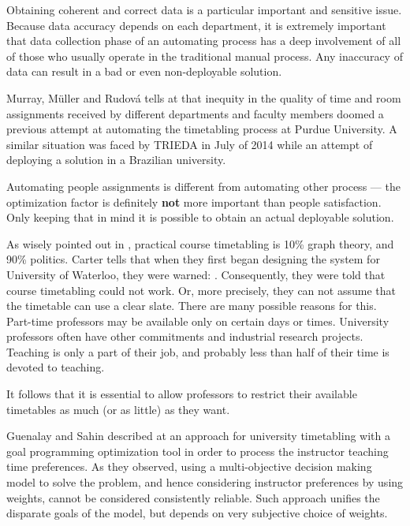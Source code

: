 Obtaining coherent and correct data is a particular important and sensitive issue. Because data accuracy depends on each department, it is extremely important that data collection phase of an automating process has a deep involvement of all of those who usually operate in the traditional manual process. Any inaccuracy of data can result in a bad or even non-deployable solution.


Murray, M\"{u}ller and Rudov\'{a} tells at \cite{Murray2007} that inequity in the quality of time and room assignments received by different departments and faculty members doomed a previous attempt at automating the timetabling process at Purdue University. A similar situation was faced by TRIEDA in July of 2014 while an attempt of deploying a solution in a Brazilian university.

Automating people assignments is different from automating other process --- the optimization factor is definitely \textbf{not} more important than people satisfaction. Only keeping that in mind it is possible to obtain an actual deployable solution.

As wisely pointed out in \cite{Carter2001}, practical course timetabling is 10\% graph theory, and 90\% politics. Carter tells that when they first began designing the system for University of Waterloo, they were warned: . Consequently, they were told that course timetabling could not work. Or, more precisely, they can not assume that the timetable can use a clear slate. There are many possible reasons for this. Part-time professors may be available only on certain days or times. University professors often have other commitments and industrial research projects. Teaching is only a part of their job, and probably less than half of their time is devoted to teaching.

It follows that it is essential to allow professors to restrict their available timetables as much (or as little) as they want.

Guenalay and Sahin described at \cite{Guenalay2006} an approach for university timetabling with a goal programming optimization tool in order to process the instructor teaching time preferences. As they observed, using a multi-objective decision making model to solve the problem, and hence considering instructor preferences by using weights, cannot be considered consistently reliable. Such approach unifies the disparate goals of the model, but depends on very subjective choice of weights.

